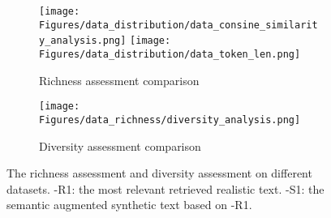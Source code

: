 \begin{figure}[t!]
\centering
\begin{subfigure}{\linewidth}
{
\texttt{[image: Figures/data\_distribution/data\_consine\_similarity\_analysis.png]}}
{
\texttt{[image: Figures/data\_distribution/data\_token\_len.png]}}
\caption{Richness assessment comparison}
\label{similarity_token}
\end{subfigure}

\begin{subfigure}{\linewidth}
\centering
\texttt{[image: Figures/data\_richness/diversity\_analysis.png]}
\vspace{-7mm}
\caption{Diversity assessment comparison}
\label{fig:diversity}
\end{subfigure}
\vspace{-5mm}
\caption{The richness assessment and diversity assessment on different datasets. \dsname-R1: the most relevant retrieved realistic text. \dsname-S1: the semantic augmented synthetic text based on \dsname-R1.}
\vspace{-3mm}
\end{figure}
